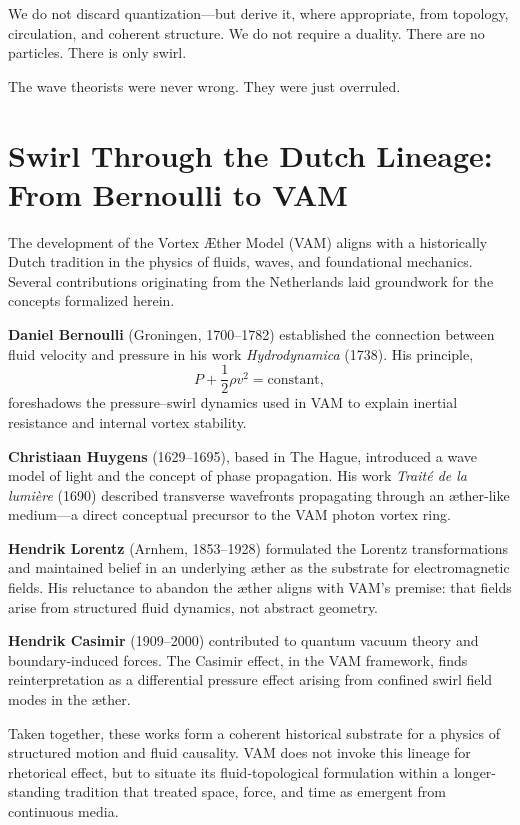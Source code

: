 \documentclass[twocolumn,aps,pre,floatfix,nofootinbib]{revtex4-2}
\begin{document}
We do not discard quantization—but derive it, where appropriate, from topology, circulation, and coherent structure. We do not require a duality. There are no particles. There is only swirl.

The wave theorists were never wrong. They were just overruled.


\section*{Swirl Through the Dutch Lineage: From Bernoulli to VAM}

The development of the Vortex \AE ther Model (VAM) aligns with a historically Dutch tradition in the physics of fluids, waves, and foundational mechanics. Several contributions originating from the Netherlands laid groundwork for the concepts formalized herein.

\textbf{Daniel Bernoulli} (Groningen, 1700–1782) established the connection between fluid velocity and pressure in his work \textit{Hydrodynamica} (1738). His principle,
\[
    P + \frac{1}{2} \rho v^2 = \text{constant},
\]
foreshadows the pressure–swirl dynamics used in VAM to explain inertial resistance and internal vortex stability.

\textbf{Christiaan Huygens} (1629–1695), based in The Hague, introduced a wave model of light and the concept of phase propagation. His work \textit{Traité de la lumière} (1690) described transverse wavefronts propagating through an æther-like medium—a direct conceptual precursor to the VAM photon vortex ring.

\textbf{Hendrik Lorentz} (Arnhem, 1853–1928) formulated the Lorentz transformations and maintained belief in an underlying æther as the substrate for electromagnetic fields. His reluctance to abandon the æther aligns with VAM's premise: that fields arise from structured fluid dynamics, not abstract geometry.

\textbf{Hendrik Casimir} (1909–2000) contributed to quantum vacuum theory and boundary-induced forces. The Casimir effect, in the VAM framework, finds reinterpretation as a differential pressure effect arising from confined swirl field modes in the æther.

Taken together, these works form a coherent historical substrate for a physics of structured motion and fluid causality. VAM does not invoke this lineage for rhetorical effect, but to situate its fluid-topological formulation within a longer-standing tradition that treated space, force, and time as emergent from continuous media.
\end{document}
